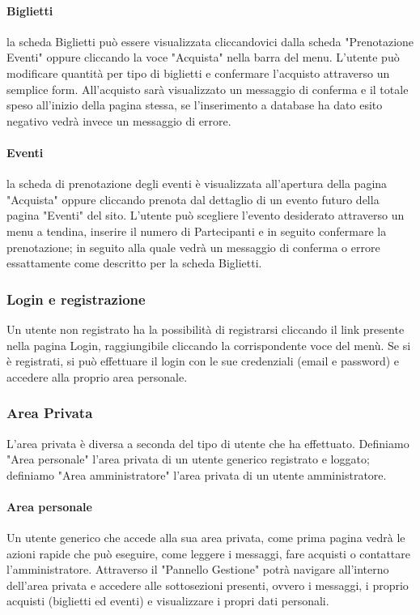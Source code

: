            \paragraph{Biglietti}la scheda Biglietti può essere visualizzata cliccandovici dalla scheda "Prenotazione Eventi" oppure cliccando la voce "Acquista" nella barra del menu. L'utente può modificare quantità per tipo di biglietti e confermare l'acquisto attraverso un semplice form. All'acquisto sarà visualizzato un messaggio di conferma e il totale speso all'inizio della pagina stessa, se l'inserimento a database ha dato esito negativo vedrà invece un messaggio di errore.
            \paragraph{Eventi}la scheda di prenotazione degli eventi è visualizzata all'apertura della pagina "Acquista" oppure cliccando prenota dal dettaglio di un evento futuro della pagina "Eventi" del sito. L'utente può scegliere l'evento desiderato attraverso un menu a tendina, inserire il numero di Partecipanti e in seguito confermare la prenotazione; in seguito alla quale vedrà un messaggio di conferma o errore essattamente come descritto per la scheda Biglietti.
        \subsubsection{Login e registrazione}
            Un utente non registrato ha la possibilità di registrarsi cliccando il link presente nella pagina Login, raggiungibile cliccando la corrispondente voce del menù. Se si è registrati, si può effettuare il login con le sue credenziali (email e password) e accedere alla proprio area personale.
        \subsubsection{Area Privata}
            L'area privata è diversa a seconda del tipo di utente che ha effettuato. Definiamo "Area personale" l'area privata di un utente generico registrato e loggato; definiamo "Area amministratore" l'area privata di un utente amministratore.
            \paragraph{Area personale} Un utente generico che accede alla sua area privata, come prima pagina vedrà le azioni rapide che può eseguire, come leggere i messaggi, fare acquisti o contattare l'amministratore. Attraverso il "Pannello Gestione" potrà navigare all'interno dell'area privata e accedere alle sottosezioni presenti, ovvero i messaggi, i proprio acquisti (biglietti ed eventi) e visualizzare i propri dati personali.
